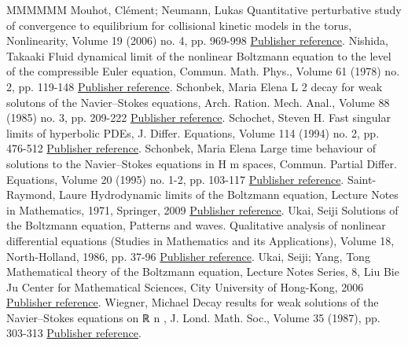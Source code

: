 \documentclass[11pt]{article}
\theoremstyle{definition}
\numberwithin{equation}{section}
\numberwithin{figure}{section}
\numberwithin{table}{section}
\begin{document}
\begin{thebibliography}{MMMMMM}
 Mouhot, Clément; Neumann, Lukas Quantitative perturbative study of convergence to equilibrium for collisional kinetic models in the torus, Nonlinearity, Volume 19 (2006) no. 4, pp. 969-998 \href{https://ahl.centre-mersenne.org/item/AHL_2020__3__561_0/#Mouhot-Neumann}{Publisher reference}.
 Nishida, Takaaki Fluid dynamical limit of the nonlinear Boltzmann equation to the level of the compressible Euler equation, Commun. Math. Phys., Volume 61 (1978) no. 2, pp. 119-148 \href{https://ahl.centre-mersenne.org/item/AHL_2020__3__561_0/#Nishida}{Publisher reference}.
 Schonbek, Maria Elena L 2  decay for weak solutons of the Navier–Stokes equations, Arch. Ration. Mech. Anal., Volume 88 (1985) no. 3, pp. 209-222 \href{https://ahl.centre-mersenne.org/item/AHL_2020__3__561_0/#Schonbek24}{Publisher reference}.
 Schochet, Steven H. Fast singular limits of hyperbolic PDEs, J. Differ. Equations, Volume 114 (1994) no. 2, pp. 476-512 \href{https://ahl.centre-mersenne.org/item/AHL_2020__3__561_0/#Schochet}{Publisher reference}.
 Schonbek, Maria Elena Large time behaviour of solutions to the Navier–Stokes equations in H m  spaces, Commun. Partial Differ. Equations, Volume 20 (1995) no. 1-2, pp. 103-117 \href{https://ahl.centre-mersenne.org/item/AHL_2020__3__561_0/#Schonbek}{Publisher reference}.
 Saint-Raymond, Laure Hydrodynamic limits of the Boltzmann equation, Lecture Notes in Mathematics, 1971, Springer, 2009 \href{https://ahl.centre-mersenne.org/item/AHL_2020__3__561_0/#Saint-Raymond}{Publisher reference}.
 Ukai, Seiji Solutions of the Boltzmann equation, Patterns and waves. Qualitative analysis of nonlinear differential equations (Studies in Mathematics and its Applications), Volume 18, North-Holland, 1986, pp. 37-96 \href{https://ahl.centre-mersenne.org/item/AHL_2020__3__561_0/#Ukai}{Publisher reference}.
 Ukai, Seiji; Yang, Tong Mathematical theory of the Boltzmann equation, Lecture Notes Series, 8, Liu Bie Ju Center for Mathematical Sciences, City University of Hong-Kong, 2006 \href{https://ahl.centre-mersenne.org/item/AHL_2020__3__561_0/#Ukai-Yang}{Publisher reference}.
 Wiegner, Michael Decay results for weak solutions of the Navier–Stokes equations on ℝ n , J. Lond. Math. Soc., Volume 35 (1987), pp. 303-313 \href{https://ahl.centre-mersenne.org/item/AHL_2020__3__561_0/#wiegner}{Publisher reference}.
\end{thebibliography}
\end{document}
